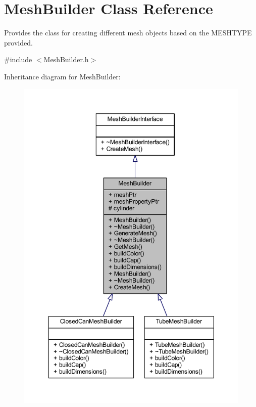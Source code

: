 \hypertarget{class_mesh_builder}{}\section{Mesh\+Builder Class Reference}
\label{class_mesh_builder}


Provides the class for creating different mesh objects based on the M\+E\+S\+H\+T\+Y\+PE provided.  




{\ttfamily \#include $<$Mesh\+Builder.\+h$>$}



Inheritance diagram for Mesh\+Builder\+:
\nopagebreak
\begin{figure}[H]
\begin{center}
\leavevmode
\includegraphics[width=350pt]{class_mesh_builder__inherit__graph}
\end{center}
\end{figure}


